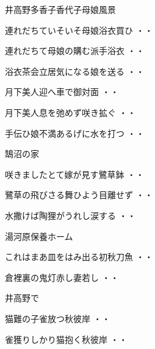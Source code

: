 \vspace{0.4cm}
井高野多香子香代子母娘風景
\begin{shiika}連れだちていそいそ母娘浴衣買ひ
\hfill{・・}\end{shiika}
\vspace{0.4cm}
\begin{shiika}連れだちて母娘の購む派手浴衣
\hfill{・・}\end{shiika}
\vspace{0.4cm}
\begin{shiika}浴衣茶会立居気になる娘を送る
\hfill{・・}\end{shiika}
\begin{shiika}月下美人迎へ車で御対面
\hfill{・・}\end{shiika}
\begin{shiika}月下美人息を弛めず咲き拡ぐ
\hfill{・・}\end{shiika}
\begin{shiika}手伝ひ娘不満あるげに水を打つ
\hfill{・・}\end{shiika}
\vspace{0.4cm}
鵠沼の家
\begin{shiika}咲きましたとて嫁が見す鷺草鉢
\hfill{・・}\end{shiika}
\begin{shiika}鷺草の飛びさる舞ひよう目離せず
\hfill{・・}\end{shiika}
\begin{shiika}水撒けば陶狸がうれし涙する
\hfill{・・}\end{shiika}
\vspace{0.4cm}
湯河原保養ホーム
\begin{shiika}これはまあ皿をはみ出る初秋刀魚
\hfill{・・}\end{shiika}
\begin{shiika}倉裡裏の鬼灯赤し妻若し
\hfill{・・}\end{shiika}
\vspace{0.4cm}
井高野で
\begin{shiika}猫難の子雀放つ秋彼岸
\hfill{・・}\end{shiika}
\begin{shiika}雀獲りしかり猫抱く秋彼岸
\hfill{・・}\end{shiika}

